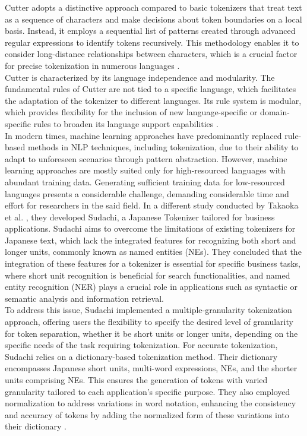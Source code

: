 \documentclass[journal]{./IEEE/IEEEtran}
\begin{document}
\newpage

Cutter adopts a distinctive approach compared to basic tokenizers that treat text as a sequence of characters and make decisions about token boundaries on a local basis. Instead, it employs a sequential list of patterns created through advanced regular expressions to identify tokens recursively. This methodology enables it to consider long-distance relationships between characters, which is a crucial factor for precise tokenization in numerous languages {\cite{Cutter}}. \\

Cutter is characterized by its language independence and modularity. The fundamental rules of Cutter are not tied to a specific language, which facilitates the adaptation of the tokenizer to different languages. Its rule system is modular, which provides flexibility for the inclusion of new language-specific or domain-specific rules to broaden its language support capabilities {\cite{Cutter}}. \\

In modern times, machine learning approaches have predominantly replaced rule-based methods in NLP techniques, including tokenization, due to their ability to adapt to unforeseen scenarios through pattern abstraction. However, machine learning approaches are mostly suited only for high-resourced languages with abundant training data. Generating sufficient training data for low-resourced languages presents a considerable challenge, demanding considerable time and effort for researchers in the said field. In a different study conducted by Takaoka et al. {\cite{Sudachi}},  they developed Sudachi, a Japanese Tokenizer tailored for business applications. Sudachi aims to overcome the limitations of existing tokenizers for Japanese text, which lack the integrated features for recognizing both short and longer units, commonly known as named entities (NEs). They concluded that the integration of these features for a tokenizer is essential for specific business tasks, where short unit recognition is beneficial for search functionalities, and named entity recognition (NER) plays a crucial role in applications such as syntactic or semantic analysis and information retrieval. \\

To address this issue, Sudachi implemented a multiple-granularity tokenization approach, offering users the flexibility to specify the desired level of granularity for token separation, whether it be short units or longer units, depending on the specific needs of the task requiring tokenization. For accurate tokenization, Sudachi relies on a dictionary-based tokenization method. Their dictionary encompasses Japanese short units, multi-word expressions, NEs, and the shorter units comprising NEs. This ensures the generation of tokens with varied granularity tailored to each application's specific purpose. They also employed normalization to address variations in word notation, enhancing the consistency and accuracy of tokens by adding the normalized form of these variations into their dictionary {\cite{Sudachi}}. \\
\end{document}
